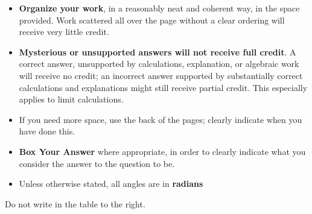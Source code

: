 \documentclass[11pt]{exam}
\theoremstyle{definition}
\begin{document}
\begin{minipage}[t]{3.7in}
\vspace{0pt}
\begin{itemize}


\item \textbf{Organize your work}, in a reasonably neat and coherent way, in
the space provided. Work scattered all over the page without a clear ordering will 
receive very little credit.  

\item \textbf{Mysterious or unsupported answers will not receive full
credit}.  A correct answer, unsupported by calculations, explanation,
or algebraic work will receive no credit; an incorrect answer supported
by substantially correct calculations and explanations might still receive
partial credit.  This especially applies to limit calculations.

\item If you need more space, use the back of the pages; clearly indicate when you have done this.

\item \textbf{Box Your Answer} where appropriate, in order to clearly indicate what you consider the answer to the question to be.

\item Unless otherwise stated, all angles are in \textbf{radians}
\end{itemize}

Do not write in the table to the right.
\end{minipage}
\hfill
\begin{minipage}[t]{2.3in}
\vspace{0pt}
\addpoints %
\gradetable[v]%

\end{minipage}
\newpage %

%
%
%
\end{document}
